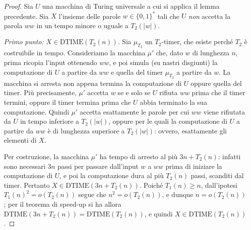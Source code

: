 \begin{proof}
Sia $U$ una macchina di Turing universale a cui si applica il lemma precedente. Sia $X$ l'insieme delle parole $w\in\{0,1\}^*$ tali che $U$ \emph{non} accetta la parola $ww$ in un tempo minore o uguale a $T_2(|w|)$.

\medskip
\noindent\emph{Primo punto: $X\in\mathrm{DTIME}(T_2(n))$.} Sia $\mu_{T_2}$ un $T_2$-timer, che esiste perché $T_2$ è costruibile in tempo. Consideriamo la macchina $\mu'$ che, dato $w$ di lunghezza $n$, prima ricopia l'input ottenendo $ww$, e poi simula (su nastri disgiunti) la computazione di $U$ a partire da $ww$ e quella del timer $\mu_{T_2}$ a partire da $w$. La macchina si arresta non appena termina la computazione di $U$ oppure quella del timer. Più precisamente, $\mu'$ accetta $w$ se e solo se $U$ rifiuta $ww$ prima che il timer termini, oppure il timer termina prima che $U$ abbia terminato la sua computazione. Quindi $\mu'$ accetta esattamente le parole per cui $ww$ viene rifiutata da $U$ in tempo inferiore a $T_2(|w|)$, oppure per le quali la computazione di $U$ a partire da $ww$ è di lunghezza superiore a $T_2(|w|)$: ovvero, esattamente gli elementi di $X$.

Per costruzione, la macchina $\mu'$ ha tempo di arresto al più $3n+T_2(n)$: infatti sono necessari $3n$ passi per passare dall'input $w$ a $ww$ prima di iniziare la computazione di $U$, e poi la computazione dura al più $T_2(n)$ passi, scanditi dal timer. Pertanto $X\in\mathrm{DTIME}(3n+T_2(n))$. Poiché $T_1(n)\ge n$, dall'ipotesi $T_1(n)^2=o(T_2(n))$ segue che $n^2=o(T_2(n))$, e dunque $n=o(T_2(n))$; per il teorema di speed-up si ha allora $\mathrm{DTIME}(3n+T_2(n))=\mathrm{DTIME}(T_2(n))$, e quindi $X\in\mathrm{DTIME}(T_2(n))$.


\end{proof}
